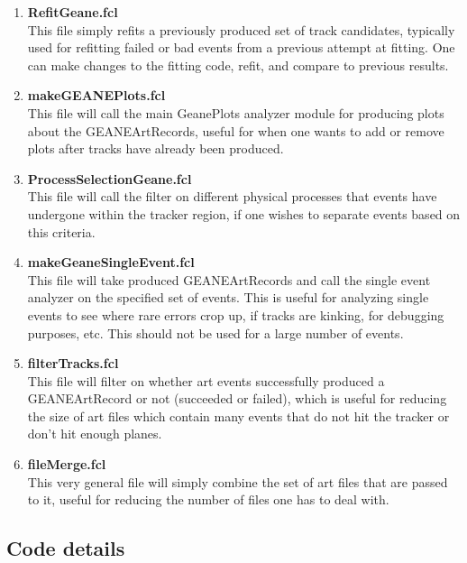 \documentclass{article}
\begin{document}
    \begin{enumerate}

      \item{\bf{RefitGeane.fcl}} \\
      This file simply refits a previously produced set of track candidates, typically used for refitting failed or bad events from a previous attempt at fitting. One can make changes to the fitting code, refit, and compare to previous results.

      \item{\bf{makeGEANEPlots.fcl}} \\
      This file will call the main GeanePlots analyzer module for producing plots about the GEANEArtRecords, useful for when one wants to add or remove plots after tracks have already been produced.

      \item{\bf{ProcessSelectionGeane.fcl}} \\
      This file will call the filter on different physical processes that events have undergone within the tracker region, if one wishes to separate events based on this criteria.

      \item{\bf{makeGeaneSingleEvent.fcl}} \\
      This file will take produced GEANEArtRecords and call the single event analyzer on the specified set of events. This is useful for analyzing single events to see where rare errors crop up, if tracks are kinking, for debugging purposes, etc. This should not be used for a large number of events.

      \item{\bf{filterTracks.fcl}} \\
      This file will filter on whether art events successfully produced a GEANEArtRecord or not (succeeded or failed), which is useful for reducing the size of art files which contain many events that do not hit the tracker or don't hit enough planes.

      \item{\bf{fileMerge.fcl}} \\
      This very general file will simply combine the set of art files that are passed to it, useful for reducing the number of files one has to deal with.

    \end{enumerate}


\subsection{Code details}
\end{document}
